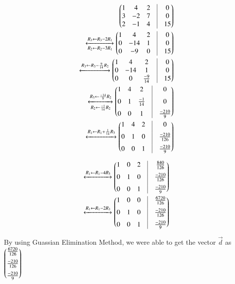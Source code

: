 	\begin{align}
		\myvec{
			1 & 4 & 2 & \vrule & 0 \\
			3 & -2 & 7 & \vrule & 0 \\
			2 & -1 & 4 & \vrule & 15 \\
		}
		\\
		\xleftrightarrow[R_2 \leftarrow R_2-3R_1]{R_3 \leftarrow R_3 - 2R_1}
		\myvec{
			1 & 4 & 2 & \vrule & 0 \\
			0 & -14 & 1 & \vrule & 0 \\
			0 & -9 & 0 & \vrule & 15
		}
		\\
		\xleftrightarrow[]{R_3\leftarrow R_3-\frac{9}{14}R_2}
		\myvec{
			1 & 4 & 2 & \vrule & 0 \\
			0 & -14 & 1 & \vrule & 0 \\
			0 & 0 & \frac{-9}{14} & \vrule & 15
		}\\
		\xleftrightarrow[R_2 \leftarrow \frac{-1}{14}R_2]{R_3 \leftarrow \frac{-14}{9}R_2}
		\myvec{
			1 & 4 & 2 & \vrule & 0 \\[0.2cm]
			0 & 1 & \frac{-1}{14} & \vrule & 0 \\[0.2cm]
			0 & 0 & 1 & \vrule & \frac{-210}{9}
		}\\
		\xleftrightarrow[]{R_1 \leftarrow R_1+\frac{1}{14}R_3}
		\myvec{
			1 & 4 & 2 & \vrule & 0 \\[0.2cm]
			0 & 1 & 0 & \vrule & \frac{-210}{126} \\[0.2cm]
			0 & 0 & 1 & \vrule & \frac{-210}{9}
		}
	\end{align}


	\begin{align}
		\xleftrightarrow[]{R_1 \leftarrow R_1-4R_3}
		\myvec{
			1 & 0 & 2 & \vrule & \frac{840}{126} \\[0.2cm]
			0 & 1 & 0 & \vrule & \frac{-210}{126} \\[0.2cm]
			0 & 0 & 1 & \vrule & \frac{-210}{9}
		}\\
		\xleftrightarrow[]{R_1 \leftarrow R_1-2R_3}
		\myvec{
			1 & 0 & 0 & \vrule & \frac{6720}{126} \\[0.2cm]
			0 & 1 & 0 & \vrule & \frac{-210}{126} \\[0.2cm]
			0 & 0 & 1 & \vrule & \frac{-210}{9}
		}
\end{align}


By using Guassian Elimination Method, we were able to get the vector $\vec{d}$ as
	$\begin{pmatrix}\frac{6720}{126} \\[0.2cm]\frac{-210}{126} \\[0.2cm]\frac{-210}{9}\end{pmatrix}$\\[0.5cm]
	
